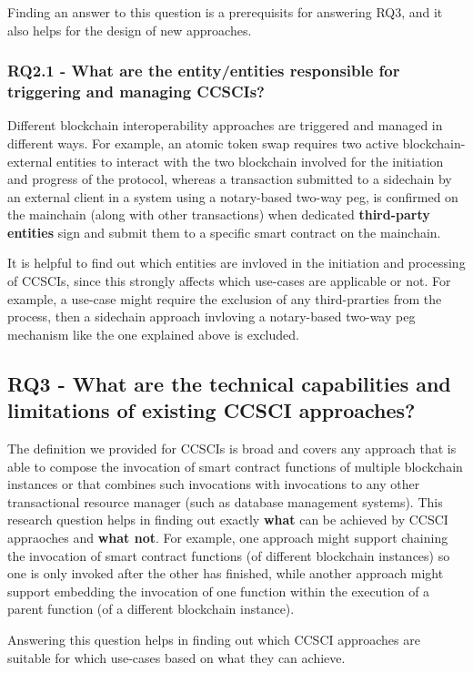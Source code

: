 \documentclass[review]{elsarticle}
\begin{document}
Finding an answer to this question is a prerequisits for answering RQ3, and it also helps for the design of new approaches.

\subsubsection*{RQ2.1 - What are the entity/entities responsible for triggering and managing CCSCIs?}
Different blockchain interoperability approaches are triggered and managed in different ways.
For example, an atomic token swap requires two active blockchain-external entities to interact with the two blockchain involved for the initiation and progress of the protocol, whereas a transaction submitted to a sidechain by an external client in a system using a notary-based two-way peg, is confirmed on the mainchain (along with other transactions) when dedicated \textbf{third-party entities} sign and submit them to a specific smart contract on the mainchain.

It is helpful to find out which entities are invloved in the initiation and processing of CCSCIs, since this strongly affects which use-cases are applicable or not.
For example, a use-case might require the exclusion of any third-prarties from the process, then a sidechain approach invloving a notary-based two-way peg mechanism like the one explained above is excluded.

\subsection*{RQ3 - What are the technical capabilities and limitations of existing CCSCI approaches?}
The definition we provided for CCSCIs is broad and covers any approach that is able to compose the invocation of smart contract functions of multiple blockchain instances or that combines such invocations with invocations to any other transactional resource manager (such as database management systems).
This research question helps in finding out exactly \textbf{what} can be achieved by CCSCI appraoches and \textbf{what not}.
For example, one approach might support chaining the invocation of smart contract functions (of different blockchain instances) so one is only invoked after the other has finished, while another approach might support embedding the invocation of one function within the execution of a parent function (of a different blockchain instance).

Answering this question helps in finding out which CCSCI approaches are suitable for which use-cases based on what they can achieve.
 
\end{document}
